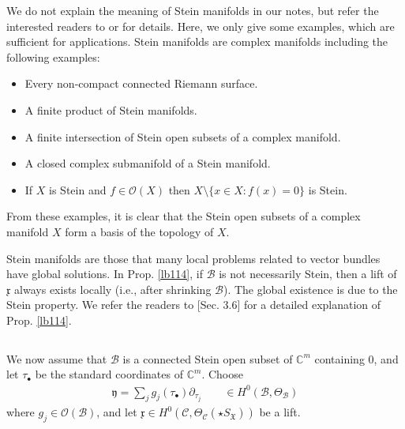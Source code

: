 \documentclass[12pt,a4paper,notitlepage]{article}
\theoremstyle{definition}
\theoremstyle{plain}
\newcommand{\fk}{\mathfrak}
\newcommand{\mc}{\mathcal}
\newcommand{\scr}{\mathscr}
\newcommand{\xk}{\mathfrak x}
\newcommand{\yk}{\mathfrak y}
\newcommand{\SX}{{S_{\fk X}}}
\newcommand{\blt}{\bullet}
\newcommand{\Cbb}{\mathbb C}
\numberwithin{equation}{section}
\begin{document}
We do not explain the meaning of Stein manifolds in our notes, but refer the interested readers to \cite[Sec. I.4]{GR-a} or \cite[Sec. III.3]{GR-b}  for details. Here, we only give some examples, which are sufficient for applications. Stein manifolds are complex manifolds including the following examples: 
\begin{itemize}
\item Every non-compact connected Riemann surface.
\item A finite product of Stein manifolds.
\item A finite intersection of Stein open subsets of a complex manifold.
\item A closed complex submanifold of a Stein manifold.
\item If $X$ is Stein and $f\in\scr O(X)$ then $X\setminus\{x\in X:f(x)=0\}$ is Stein.
\end{itemize}
From these examples, it is clear that the Stein open subsets of a  complex manifold $X$ form a basis of the topology of $X$.

Stein manifolds are those that many local problems related to vector bundles have global solutions. In Prop. \ref{lb114}, if $\mc B$ is not necessarily Stein, then a lift of $\xk$ always exists locally (i.e., after shrinking $\mc B$). The global existence is due to the Stein property. We refer the readers to \cite{Gui}[Sec. 3.6] for a detailed explanation of Prop. \ref{lb114}.




\subsection{}\label{lb126}


We now assume that $\mc B$ is a connected Stein open subset of $\Cbb^m$ containing $0$, and let $\tau_\blt$ be the standard coordinates of $\Cbb^m$. Choose
\begin{align}
\yk=\sum_j g_j(\tau_\blt)\partial_{\tau_j}\qquad \in H^0(\mc B,\Theta_{\mc B})\label{eq215}
\end{align}
where $g_j\in\scr O(\mc B)$, and let $\xk\in H^0(\mc C,\Theta_{\mc C}(\star\SX))$ be a lift. 
\end{document}
